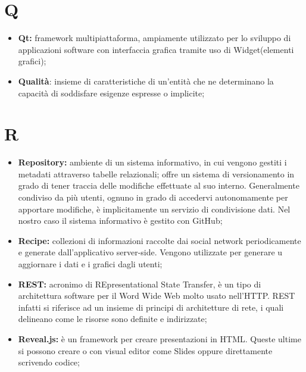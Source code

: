 \section*{Q} %
\label{sec:q}
	\begin{itemize}
		\item \textbf{Qt:} framework multipiattaforma, ampiamente utilizzato per lo sviluppo di applicazioni software con interfaccia grafica tramite uso di Widget(elementi grafici);
		\item \textbf{Qualità}: insieme di caratteristiche di un'entità che ne determinano la capacità di soddisfare esigenze espresse o implicite;	
	\end{itemize}
\pagebreak

\section*{R} %
\label{sec:r}
	\begin{itemize}
		\item \textbf{Repository:} ambiente di un sistema informativo, in cui vengono gestiti i metadati attraverso tabelle relazionali; offre un sistema di versionamento in grado di tener traccia delle modifiche effettuate al suo interno. Generalmente condiviso da più utenti, ognuno in grado di accedervi autonomamente per apportare modifiche, è implicitamente un servizio di condivisione dati. Nel nostro caso il sistema informativo è gestito con GitHub;	
		\item \textbf{Recipe:} collezioni di informazioni raccolte dai social network periodicamente e generate dall'applicativo server-side. Vengono utilizzate per generare u aggiornare i dati e i grafici dagli utenti;
		\item \textbf{REST:} acronimo di REpresentational State Transfer, è un tipo di architettura software per il Word Wide Web molto usato nell'HTTP. REST infatti si riferisce ad un insieme di principi di architetture di rete, i quali delineano come le risorse sono definite e indirizzate;
		\item \textbf{Reveal.js:} è un framework per creare presentazioni in HTML. Queste ultime si possono creare o con visual editor come Slides oppure direttamente scrivendo codice;
		\end{itemize}
\pagebreak


